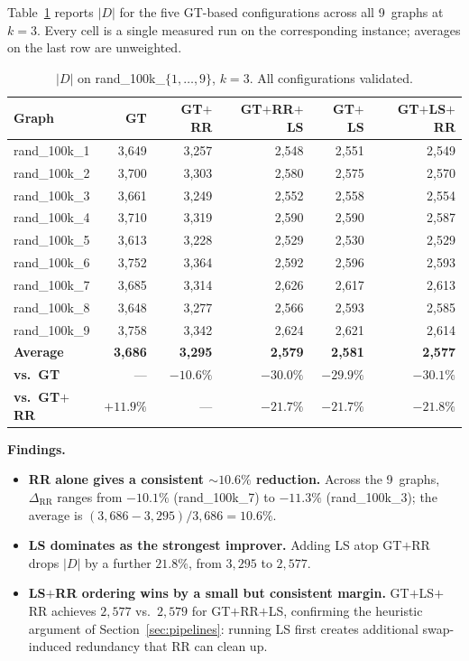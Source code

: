 \documentclass[11pt,a4paper]{article}
\begin{document}
Table~\ref{tab:main} reports $|D|$ for the five GT-based configurations
across all 9~graphs at $k=3$. Every cell is a single measured run on
the corresponding instance; averages on the last row are unweighted.

\begin{table}[ht]
\centering
\caption{$|D|$ on rand\_100k\_$\{1,\ldots,9\}$, $k=3$.
  All configurations validated.}
\label{tab:main}
\small
\begin{tabular}{lrrrrr}
\toprule
\textbf{Graph}
  & \textbf{GT}
  & \textbf{GT$+$RR}
  & \textbf{GT$+$RR$+$LS}
  & \textbf{GT$+$LS}
  & \textbf{GT$+$LS$+$RR}\\
\midrule
rand\_100k\_1 & 3{,}649 & 3{,}257 & 2{,}548 & 2{,}551 & 2{,}549 \\
rand\_100k\_2 & 3{,}700 & 3{,}303 & 2{,}580 & 2{,}575 & 2{,}570 \\
rand\_100k\_3 & 3{,}661 & 3{,}249 & 2{,}552 & 2{,}558 & 2{,}554 \\
rand\_100k\_4 & 3{,}710 & 3{,}319 & 2{,}590 & 2{,}590 & 2{,}587 \\
rand\_100k\_5 & 3{,}613 & 3{,}228 & 2{,}529 & 2{,}530 & 2{,}529 \\
rand\_100k\_6 & 3{,}752 & 3{,}364 & 2{,}592 & 2{,}596 & 2{,}593 \\
rand\_100k\_7 & 3{,}685 & 3{,}314 & 2{,}626 & 2{,}617 & 2{,}613 \\
rand\_100k\_8 & 3{,}648 & 3{,}277 & 2{,}566 & 2{,}593 & 2{,}585 \\
rand\_100k\_9 & 3{,}758 & 3{,}342 & 2{,}624 & 2{,}621 & 2{,}614 \\
\midrule
\textbf{Average}
  & \textbf{3{,}686} & \textbf{3{,}295} & \textbf{2{,}579}
  & \textbf{2{,}581} & \textbf{2{,}577}\\
\textbf{vs.\ GT}
  & --- & $-10.6\%$ & $-30.0\%$ & $-29.9\%$ & $-30.1\%$\\
\textbf{vs.\ GT$+$RR}
  & $+11.9\%$ & --- & $-21.7\%$ & $-21.7\%$ & $-21.8\%$\\
\bottomrule
\end{tabular}
\end{table}

\textbf{Findings.}
\begin{itemize}[nosep]
  \item \textbf{RR alone gives a consistent ${\sim}10.6\%$ reduction.}
    Across the 9~graphs, $\Delta_{\text{RR}}$ ranges from $-10.1\%$
    (rand\_100k\_7) to $-11.3\%$ (rand\_100k\_3); the average is
    $(3{,}686-3{,}295)/3{,}686=10.6\%$.
  \item \textbf{LS dominates as the strongest improver.}
    Adding LS atop GT$+$RR drops $|D|$ by a further $21.8\%$, from
    $3{,}295$ to $2{,}577$.
  \item \textbf{LS$+$RR ordering wins by a small but consistent margin.}
    GT$+$LS$+$RR achieves $2{,}577$ vs.\ $2{,}579$ for GT$+$RR$+$LS,
    confirming the heuristic argument of
    Section~\ref{sec:pipelines}: running LS first creates additional
    swap-induced redundancy that RR can clean up.
\end{itemize}
\end{document}
